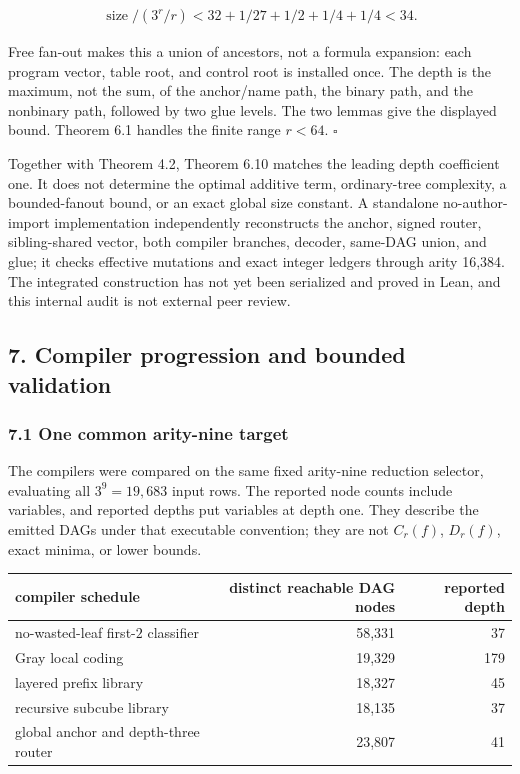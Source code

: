 \documentclass[
  11pt,
]{article}
\theoremstyle{definition}
\theoremstyle{remark}
\begin{document}
\[
\begin{aligned}
\operatorname{size}/(3^r/r) < 32+1/27+1/2+1/4+1/4 < 34.
\end{aligned}
\]

Free fan-out makes this a union of ancestors, not a formula expansion:
each program vector, table root, and control root is installed once. The
depth is the maximum, not the sum, of the anchor/name path, the binary
path, and the nonbinary path, followed by two glue levels. The two
lemmas give the displayed bound. Theorem 6.1 handles the finite range
\(r<64\). \(\square\)

Together with Theorem 4.2, Theorem 6.10 matches the leading depth
coefficient one. It does not determine the optimal additive term,
ordinary-tree complexity, a bounded-fanout bound, or an exact global
size constant. A standalone no-author-import implementation
independently reconstructs the anchor, signed router, sibling-shared
vector, both compiler branches, decoder, same-DAG union, and glue; it
checks effective mutations and exact integer ledgers through arity
16,384. The integrated construction has not yet been serialized and
proved in Lean, and this internal audit is not external peer review.

\hypertarget{compiler-progression-and-bounded-validation}{%
\subsection{7. Compiler progression and bounded
validation}\label{compiler-progression-and-bounded-validation}}

\hypertarget{one-common-arity-nine-target}{%
\subsubsection{7.1 One common arity-nine
target}\label{one-common-arity-nine-target}}

The compilers were compared on the same fixed arity-nine reduction
selector, evaluating all \(3^9=19,683\) input rows. The reported node
counts include variables, and reported depths put variables at depth
one. They describe the emitted DAGs under that executable convention;
they are not \(C_r(f)\), \(D_r(f)\), exact minima, or lower bounds.

\begin{longtable}[]{@{}lrr@{}}
\toprule\noalign{}
compiler schedule & distinct reachable DAG nodes & reported depth \\
\midrule\noalign{}
\endhead
\bottomrule\noalign{}
\endlastfoot
no-wasted-leaf first-\(2\) classifier & 58,331 & 37 \\
Gray local coding & 19,329 & 179 \\
layered prefix library & 18,327 & 45 \\
recursive subcube library & 18,135 & 37 \\
global anchor and depth-three router & 23,807 & 41 \\
\end{longtable}
\end{document}
